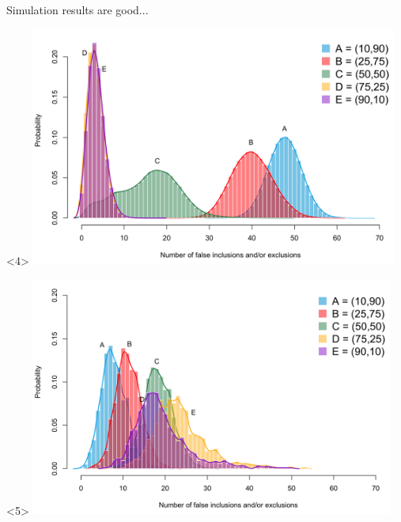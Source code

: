 \documentclass{beamer}\usepackage[]{graphicx}\usepackage[]{color}
\begin{document}
\begin{frame}{Simulation results are good...}
\begin{onlyenv}
	\end{onlyenv}
	\begin{onlyenv}
		\includegraphics[height=3.1in]{figure/sim3}
	\end{onlyenv}
	\begin{onlyenv}
		\includegraphics[height=3.1in]{figure/sim6}
	\end{onlyenv}	
\end{frame}
\end{document}
